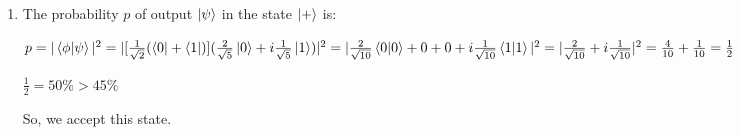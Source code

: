 \documentclass{article}
\begin{document}
\begin{enumerate}
    \item The probability $p$ of output $\ket{\psi}$ in the state $\ket{+}$ is:

          $p=|\braket{\phi|\psi}|^2=|[\frac{1}{\sqrt{2}}(\bra{0}+\bra{1})](\frac{2}{\sqrt{5}}\ket{0}+i\frac{1}{\sqrt{5}}\ket{1})|^2
              \\=|\frac{2}{\sqrt{10}}\braket{0|0}+0+0+i\frac{1}{\sqrt{10}}\braket{1|1}|^2
              \\=|\frac{2}{\sqrt{10}}+i\frac{1}{\sqrt{10}}|^2
              \\=\frac{4}{10}+\frac{1}{10}
              \\=\frac{1}{2}$

          $\frac{1}{2}=50\%>45\%$

          So, we accept this state.

\end{enumerate}
\end{document}
